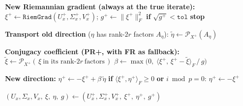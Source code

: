 \begin{algorithm}
\begin{algorithmic}[1]
    \State \textbf{New Riemannian gradient (always at the true iterate):}
    \State $\xi^+ \gets \texttt{RiemGrad}(U_x^+,\Sigma_x^+,V_x^+)$;\quad
           $g^+ \gets \|\xi^+\|_F^2$
    \State \textbf{if} $\sqrt{g^+} < \texttt{tol}$ \textbf{stop}

    \State \textbf{Transport old direction} ($\eta$ has rank-$2r$ factors $A_\eta$):
    \State $\tilde\eta \gets \mathcal{P}_{X^+}(A_\eta)$

    \State \textbf{Conjugacy coefficient (PR+, with FR as fallback):}
    \State $\tilde\xi \gets \mathcal{P}_{X^+}(\,\xi\ \text{in its rank-}2r\ \text{factors}\,)$
    \State $\beta \gets \max\!\big(0,\; \langle \xi^+,\, \xi^+ - \tilde\xi\rangle_F \,/\, g\big)$

    \State \textbf{New direction:} $\eta^+ \gets -\xi^+ + \beta\,\tilde\eta$
    \State \textbf{if} $\langle \xi^+, \eta^+\rangle_F \ge 0$ \textbf{ or } $i \bmod p = 0$:
           \; $\eta^+ \gets -\xi^+$ 

    \State $(U_x,\Sigma_x,V_x,\ \xi,\ \eta,\ g) \gets (U_x^+,\Sigma_x^+,V_x^+,\ \xi^+,\ \eta^+,\ g^+)$

\EndFor

\end{algorithmic}
\end{algorithm}